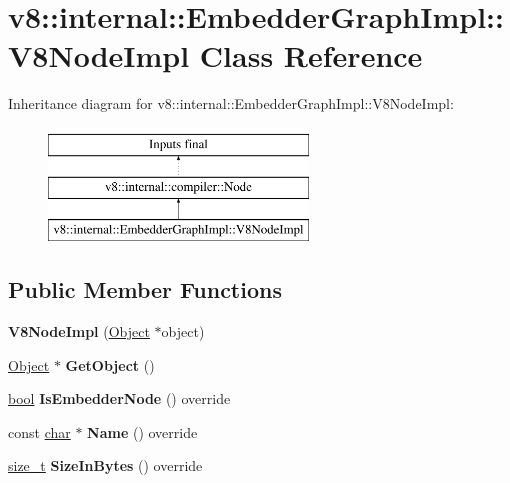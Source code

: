 \hypertarget{classv8_1_1internal_1_1EmbedderGraphImpl_1_1V8NodeImpl}{}\section{v8\+:\+:internal\+:\+:Embedder\+Graph\+Impl\+:\+:V8\+Node\+Impl Class Reference}
\label{classv8_1_1internal_1_1EmbedderGraphImpl_1_1V8NodeImpl}
Inheritance diagram for v8\+:\+:internal\+:\+:Embedder\+Graph\+Impl\+:\+:V8\+Node\+Impl\+:\begin{figure}[H]
\begin{center}
\leavevmode
\includegraphics[height=3.000000cm]{classv8_1_1internal_1_1EmbedderGraphImpl_1_1V8NodeImpl}
\end{center}
\end{figure}
\subsection*{Public Member Functions}
\begin{DoxyCompactItemize}
\item 
\mbox{\label{classv8_1_1internal_1_1EmbedderGraphImpl_1_1V8NodeImpl_a927cc03087f2ea774066286255df8259}} 
{\bfseries V8\+Node\+Impl} (\mbox{\hyperlink{classv8_1_1internal_1_1Object}{Object}} $\ast$object)
\item 
\mbox{\label{classv8_1_1internal_1_1EmbedderGraphImpl_1_1V8NodeImpl_a0d434babbcb6cfa9a1dd2fe096d49623}} 
\mbox{\hyperlink{classv8_1_1internal_1_1Object}{Object}} $\ast$ {\bfseries Get\+Object} ()
\item 
\mbox{\label{classv8_1_1internal_1_1EmbedderGraphImpl_1_1V8NodeImpl_a5784b5e0be516a1a063135e361db9e59}} 
\mbox{\hyperlink{classbool}{bool}} {\bfseries Is\+Embedder\+Node} () override
\item 
\mbox{\label{classv8_1_1internal_1_1EmbedderGraphImpl_1_1V8NodeImpl_a156ac0bface67f5e63909c7f6ef60d23}} 
const \mbox{\hyperlink{classchar}{char}} $\ast$ {\bfseries Name} () override
\item 
\mbox{\label{classv8_1_1internal_1_1EmbedderGraphImpl_1_1V8NodeImpl_aaee68e942f50da62d4384d61c1ab27f0}} 
\mbox{\hyperlink{classsize__t}{size\+\_\+t}} {\bfseries Size\+In\+Bytes} () override
\end{DoxyCompactItemize}
